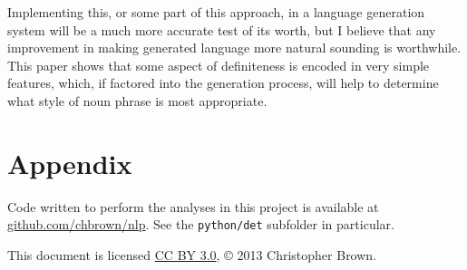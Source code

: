 \documentclass[11pt]{article}\usepackage{graphicx, color}
\begin{document}
Implementing this, or some part of this approach, in a language generation system will be a much more accurate test of its worth, but I believe that any improvement in making generated language more natural sounding is worthwhile. This paper shows that some aspect of definiteness is encoded in very simple features, which, if factored into the generation process, will help to determine what style of noun phrase is most appropriate.



\section*{Appendix}

Code written to perform the analyses in this project is available at \href{https://github.com/chbrown/nlp}{github.com/chbrown/nlp}. See the \texttt{python/det} subfolder in particular.

This document is licensed \href{http://creativecommons.org/licenses/by/3.0/}{CC BY 3.0}, \copyright{} 2013 Christopher Brown.


\end{document}

